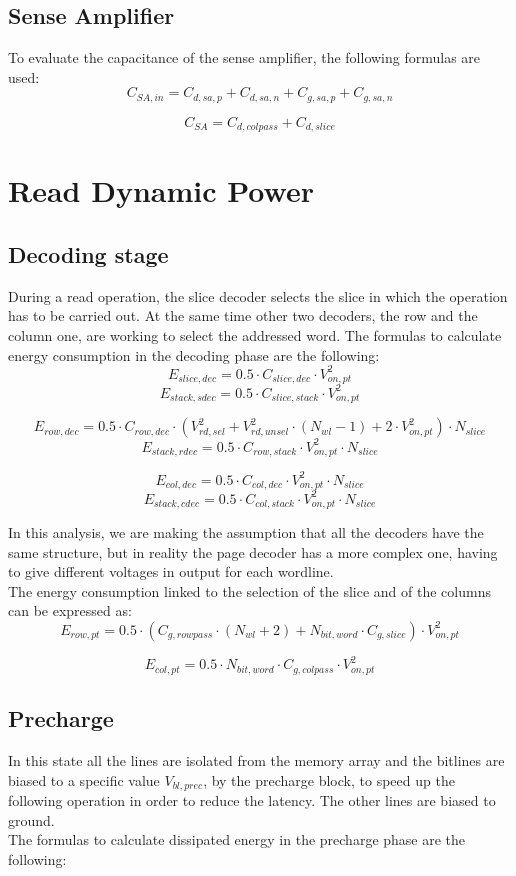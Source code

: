 \subsection{Sense Amplifier}
\label{subsec:dec_capacitance}
To evaluate the capacitance of the sense amplifier, the following formulas are used:
\[
C_{SA,in}=C_{d,sa,p}+C_{d,sa,n}+C_{g,sa,p}+C_{g,sa,n}
\]

\[
C_{SA}=C_{d,colpass}+C_{d,slice}
\]

\section{Read Dynamic Power}
\label{sec:read_power}
\subsection{Decoding stage}
\label{sec:decoding_stage}
During a read operation, the slice decoder selects the slice in which the operation has to be carried out.
At the same time other two decoders, the row and the column one, are working to select the addressed word.
The formulas to calculate energy consumption in the decoding phase are the following:
\[
E_{slice,dec}= 0.5 \cdot C_{slice,dec} \cdot V_{on,pt}^2
\]
\[
E_{stack,sdec}=0.5 \cdot C_{slice,stack} \cdot V_{on,pt}^2
\]

\[
E_{row,dec}= 0.5 \cdot C_{row,dec} \cdot (V_{rd,sel}^2+ V_{rd,unsel}^2 \cdot (N_{wl}-1) + 2 \cdot V_{on,pt}^2) \cdot N_{slice}
\]
\[
E_{stack,rdec}=0.5 \cdot C_{row,stack} \cdot V_{on,pt}^2 \cdot N_{slice}
\]

\[
E_{col,dec}= 0.5 \cdot C_{col,dec} \cdot V_{on,pt}^2 \cdot N_{slice}
\]
\[
E_{stack,cdec}=0.5 \cdot C_{col,stack} \cdot V_{on,pt}^2 \cdot N_{slice}
\]

In this analysis, we are making the assumption that all the decoders have the same structure, but in reality the page decoder has a more complex one, having to give different voltages in output for each wordline.\\
The energy consumption linked to the selection of the slice and of the columns can be expressed as:
\[
E_{row,pt}= 0.5 \cdot (C_{g,rowpass} \cdot (N_{wl}+2) + N_{bit,word} \cdot C_{g,slice} ) \cdot V_{on,pt}^2
\]

\[
E_{col,pt}= 0.5 \cdot N_{bit,word} \cdot C_{g,colpass} \cdot V_{on,pt}^2
\]

\subsection{Precharge}
\label{sec:precharge}
In this state all the lines are isolated from the memory array and the bitlines are biased to a specific value $V_{bl,prec}$, by the precharge block, to speed up the following operation in order to reduce the latency. The other lines are biased to ground.\\
The formulas to calculate dissipated energy in the precharge phase are the following:

